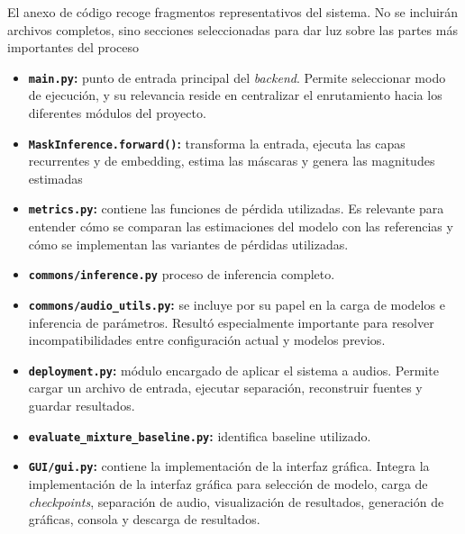 El anexo de código recoge fragmentos representativos del sistema. No se incluirán archivos completos, sino secciones seleccionadas para dar luz sobre las partes más importantes del proceso

\begin{itemize}
    \item \textbf{\texttt{main.py}:} punto de entrada principal del \textit{backend}. Permite seleccionar modo de ejecución, y su relevancia reside en centralizar el enrutamiento hacia los diferentes módulos del proyecto.
    \item \textbf{\texttt{MaskInference.forward()}:}  transforma la entrada, ejecuta las capas recurrentes y de embedding, estima las máscaras y genera las magnitudes estimadas
    \item \textbf{\texttt{metrics.py}:} contiene las funciones de pérdida utilizadas. Es relevante para entender cómo se comparan las estimaciones del modelo con las referencias y cómo se implementan las variantes de pérdidas utilizadas.
    \item \textbf{\texttt{commons/inference.py}} proceso de inferencia completo.
    \item \textbf{\texttt{commons/audio\_utils.py}:} se incluye por su papel en la carga de modelos e inferencia de parámetros. Resultó especialmente importante para resolver incompatibilidades entre configuración actual y modelos previos.
    \item \textbf{\texttt{deployment.py}:} módulo encargado de aplicar el sistema a audios. Permite cargar un archivo de entrada, ejecutar separación, reconstruir fuentes y guardar resultados.
    \item \textbf{\texttt{evaluate\_mixture\_baseline.py}:} identifica baseline utilizado.
    \item \textbf{\texttt{GUI/gui.py}:} contiene la implementación de la interfaz gráfica. Integra la implementación de la interfaz gráfica para selección de modelo, carga de \textit{checkpoints}, separación de audio, visualización de resultados, generación de gráficas, consola y descarga de resultados.
\end{itemize}